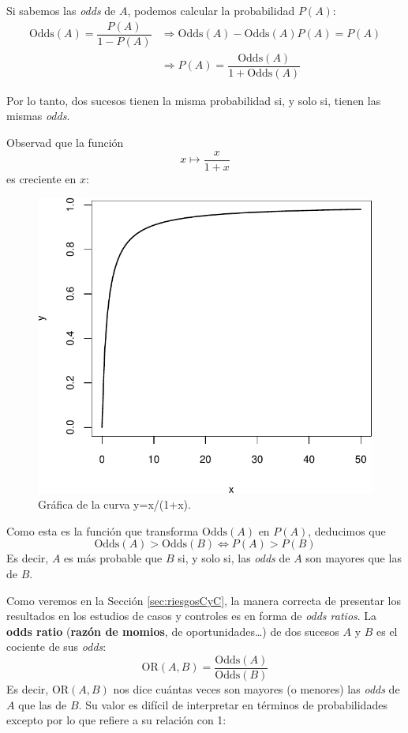 \documentclass[
]{book}
\theoremstyle{definition}
\theoremstyle{definition}
\theoremstyle{definition}
\theoremstyle{definition}
\theoremstyle{remark}
\begin{document}
Si sabemos las \emph{odds} de \(A\), podemos calcular la probabilidad \(P(A)\):
\[
\begin{array}{rl}
\text{Odds}(A)=\dfrac{P(A)}{1-P(A)}\!\!\!\! & \Longrightarrow \text{Odds}(A)-\text{Odds}(A)P(A)=P(A)\\ 
& \Longrightarrow P(A)=\dfrac{\text{Odds}(A)}{1+\text{Odds}(A)}
\end{array}
\]

Por lo tanto, dos sucesos tienen la misma probabilidad si, y solo si, tienen las mismas \emph{odds}.

Observad que la función
\[
x\mapsto\frac{x}{1+x}
\]
es creciente en \(x\):

\begin{figure}

{\centering \includegraphics[width=0.5\linewidth]{INREMDN_files/figure-latex/unnamed-chunk-108-1} 

}

\caption{Gráfica de la curva y=x/(1+x).}\label{fig:unnamed-chunk-108}
\end{figure}

Como esta es la función que transforma \(\text{Odds}(A)\) en \(P(A)\), deducimos que
\[
\text{Odds}(A)>\text{Odds}(B)\Longleftrightarrow P(A)>P(B)
\]
Es decir, \(A\) es más probable que \(B\) si, y solo si, las \emph{odds} de \(A\) son mayores que las de \(B\).

Como veremos en la Sección \ref{sec:riesgosCyC}, la manera correcta de presentar los resultados en los estudios de casos y controles es en forma de \emph{odds ratios}. La \textbf{odds ratio} (\textbf{razón de momios}, de oportunidades\ldots) de dos sucesos \(A\) y \(B\) es el cociente de sus \emph{odds}:
\[
\text{OR}(A,B)=\frac{\text{Odds}(A)}{\text{Odds}(B)}
\]
Es decir, \(\text{OR}(A,B)\) nos dice cuántas veces son mayores (o menores) las \emph{odds} de \(A\) que las de \(B\). Su valor es difícil de interpretar en términos de probabilidades excepto por lo que refiere a su relación con 1:
\end{document}
